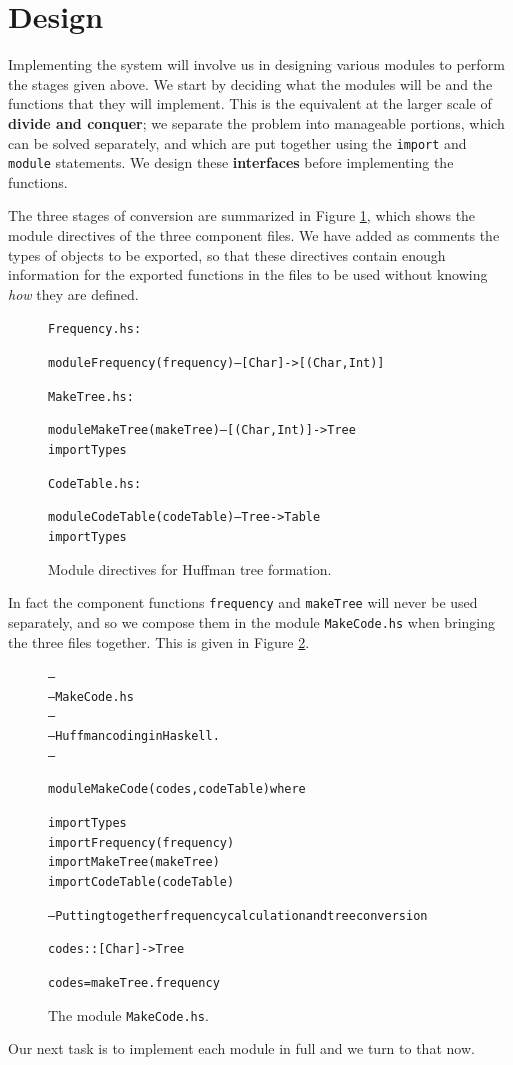 \section{Design}

Implementing the system will involve us in designing various modules to
perform the stages given above. We start by deciding what the modules will
be  and the functions that they will implement. This is the equivalent at the
larger scale of \textbf{divide and conquer};
we separate the problem into
manageable portions, which can be solved separately, and which are put
together using the \texttt{import} and \texttt{module} statements. We design
these \textbf{interfaces} before implementing the functions.

The three stages of conversion are summarized in Figure \ref{codeDesign},
which shows the module directives of the three component files. We have added
as comments the types of objects to be exported, so that these directives
contain enough information for the exported functions in the
files to be used without knowing {\em how\/} they are defined. 

\begin{figure}\begin{alltt}
Frequency.hs:

module Frequency ( frequency )  -- [Char] -> [(Char,Int)]

\hrulefill

MakeTree.hs:

module MakeTree ( makeTree )    -- [(Char,Int)] -> Tree
import Types

\hrulefill

CodeTable.hs:

module CodeTable ( codeTable )  -- Tree -> Table
import Types 
\end{alltt}
\caption{Module directives for Huffman tree formation.}
\label{codeDesign}
\end{figure}
In fact the component functions \texttt{frequency} and \texttt{makeTree} will
never be used separately, and so we compose them in the module 
\texttt{MakeCode.hs} when bringing the three files together. This is given in Figure
\ref{makeCode}.

\begin{figure}
\begin{alltt}
-- 								
--         MakeCode.hs							
-- 								
--         Huffman coding in Haskell.					
-- 								

module MakeCode ( codes, codeTable ) where

import Types
import Frequency ( frequency )
import MakeTree  ( makeTree )
import CodeTable ( codeTable )

-- Putting together frequency calculation and tree conversion	

codes :: [Char] -> Tree

codes = makeTree . frequency
\end{alltt}
\caption{The module \texttt{MakeCode.hs}.}
\label{makeCode}
\end{figure}
Our next task is to implement each module in full and we turn to that now.

